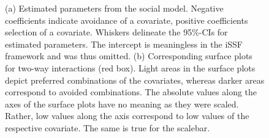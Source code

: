 \documentclass[abstract=on,10pt,a4paper,bibliography=totocnumbered]{scrartcl}
\begin{document}
\begin{figure}[hbtp]
  \begin{center}
    \caption{(a) Estimated parameters from the social model. Negative
    coefficients indicate avoidance of a covariate, positive coefficients
    selection of a covariate. Whiskers delineate the 95\%-CIs for estimated
    parameters. The intercept is meaningless in the iSSF framework and was thus
    omitted. (b) Corresponding surface plots for two-way interactions (red box).
    Light areas in the surface plots depict preferred combinations of the
    covariates, whereas darker areas correspond to avoided combinations. The
    absolute values along the axes of the surface plots have no meaning as they
    were scaled. Rather, low values along the axis correspond to low values of
    the respective covariate. The same is true for the scalebar.}
    \label{SocialModel}
  \end{center}
\end{figure}
\end{document}
